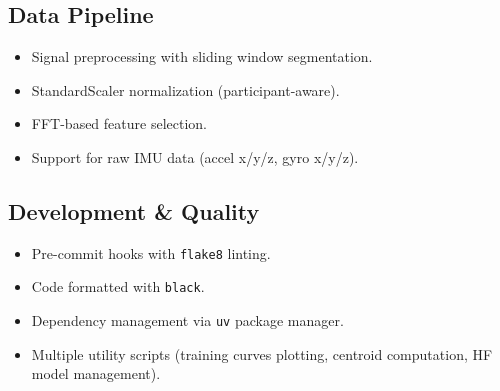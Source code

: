 \subsection*{Data Pipeline}
\begin{itemize}
    \item Signal preprocessing with sliding window segmentation.
    \item StandardScaler normalization (participant-aware).
    \item FFT-based feature selection.
    \item Support for raw IMU data (accel x/y/z, gyro x/y/z).
\end{itemize}

\subsection*{Development \& Quality}
\begin{itemize}
    \item Pre-commit hooks with \texttt{flake8} linting.
    \item Code formatted with \texttt{black}.
    \item Dependency management via \texttt{uv} package manager.
    \item Multiple utility scripts (training curves plotting, centroid computation, HF model management).
\end{itemize}
